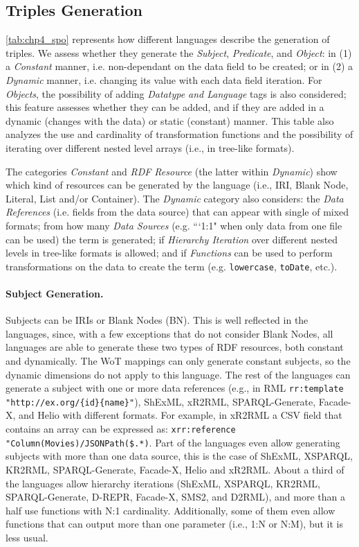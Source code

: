 \subsection{Triples Generation}
\cref{tab:chp4_spo} represents how different languages describe the generation of triples. We assess whether they generate the \textit{Subject}, \textit{Predicate}, and \textit{Object}: in (1) a \textit{Constant} manner, i.e. non-dependant on the data field to be created; or in (2) a \textit{Dynamic} manner, i.e. changing its value with each data field iteration. For \textit{Objects}, the possibility of adding \textit{Datatype and Language} tags is also considered; this feature assesses whether they can be added, and if they are added in a dynamic (changes with the data) or static (constant) manner. This table also analyzes the use and cardinality of transformation functions and the possibility of iterating over different nested level arrays (i.e., in tree-like formats).

The categories \textit{Constant} and \textit{RDF Resource} (the latter within \textit{Dynamic}) show which kind of resources can be generated by the language (i.e., IRI, Blank Node, Literal, List and/or Container). The \textit{Dynamic} category also considers: the \textit{Data References} (i.e. fields from the data source) that can appear with single of mixed formats; from how many \textit{Data Sources} (e.g. ```1:1" when only data from one file can be used) the term is generated; if \textit{Hierarchy Iteration} over different nested levels in tree-like formats is allowed; and if \textit{Functions} can be used to perform transformations on the data to create the term (e.g. \texttt{lowercase}, \texttt{toDate}, etc.).

\noindent\paragraph{\textbf{Subject Generation.}} Subjects can be IRIs or Blank Nodes (BN). This is well reflected in the languages, since, with a few exceptions that do not consider Blank Nodes, all languages are able to generate these two types of RDF resources, both constant and dynamically. The WoT mappings can only generate constant subjects, so the dynamic dimensions do not apply to this language. The rest of the languages can generate a subject with one or more data references (e.g., in RML \texttt{rr:template "http://ex.org/\{id\}\-\{name\}"}), ShExML, xR2R\-ML, SPARQL-Generate, Facade-X, and Helio with different formats. For example, in xR2RML a CSV field that contains an array can be expressed as: \texttt{xrr:reference "Column(Mo\-vies)/JSONPath(\$.*)}. Part of the languages even allow generating subjects with more than one data source, this is the case of ShExML, XSPARQL, KR2RML, SPARQL-Generate, Facade-X, Helio and xR2RML. About a third of the languages allow hierarchy iterations (ShExML, XSPARQL, KR2RML, SPARQL-Generate, D-REPR, Facade-X, SMS2, and D2RML), and more than a half use functions with N:1 cardinality. Additionally, some of them even allow functions that can output more than one parameter (i.e., 1:N or N:M), but it is less usual.



